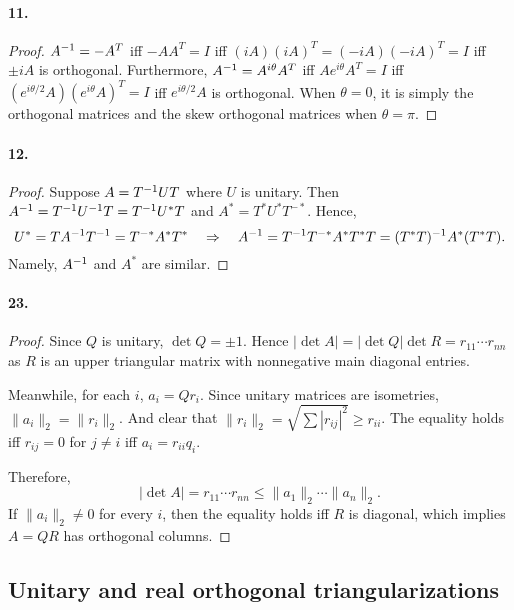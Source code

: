   \paragraph{11.}
  \begin{proof}
    $A^{-1}=-A^T$ iff $-AA^T=I$ iff $(iA)(iA)^T=(-iA)(-iA)^T=I$ iff $\pm iA$ is
    orthogonal. Furthermore, $A^{-1} = A^{i\theta}A^T$ iff $Ae^{i\theta}A^T=I$ 
    iff $(e^{i\theta/2}A)(e^{i\theta}A)^T=I$ iff $e^{i\theta/2}A$ is orthogonal.
    When $\theta=0$, it is simply the orthogonal matrices and the skew 
    orthogonal matrices when $\theta=\pi$.
  \end{proof}

  \paragraph{12.}
  \begin{proof}
    Suppose $A=T^{-1} UT$ where $U$ is unitary. Then $A^{-1} = T^{-1} U^{-1} T=T^{-1}
    U^*T$ and $A^* = T^*U^*T^{-*}$. Hence, 
    \[
      U^*=TA^{-1} T^{-1} = T^{-*}A^*T^* \quad\Rightarrow\quad
      A^{-1} = T^{-1} T^{-*} A^* T^*T = (T^*T)^{-1} A^* (T^*T).
    \]
    Namely, $A^{-1}$ and $A^*$ are similar.
  \end{proof}

  \paragraph{23.}
  \begin{proof}
    Since $Q$ is unitary, $\det Q=\pm 1$. Hence $|\det A|=|\det Q|\det R=r_{11}
    \cdots r_{nn}$ as $R$ is an upper triangular matrix with nonnegative main
    diagonal entries.\par
    Meanwhile, for each $i$, $a_i=Qr_i$. Since unitary matrices are isometries,
    $\|a_i\|_2=\|r_i\|_2$. And clear that $\|r_i\|_2=\sqrt{\sum|r_{ij}|^2}\ge 
    r_{ii}$. The equality holds iff $r_{ij}=0$ for $j\ne i$ iff $a_i=r_{ii}q_i$.
    \par
    Therefore, 
    \[
      |\det A|=r_{11}\cdots r_{nn} \le \|a_1\|_2\cdots\|a_n\|_2.
    \]
    If $\|a_i\|_2\ne 0$ for every $i$, then the equality holds iff $R$ is 
    diagonal, which implies $A=QR$ has orthogonal columns. 
  \end{proof}

\setcounter{subsection}{2}
\subsection{Unitary and real orthogonal triangularizations}
